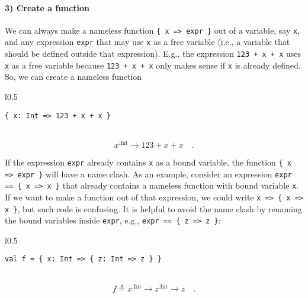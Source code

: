 \paragraph{3) Create a function}

We can always make a nameless function \lstinline!{ x => expr }!
out of a variable, say \lstinline!x!, and any expression \lstinline!expr!
that may use \lstinline!x! as a free variable
(i.e., a variable that should be defined outside that expression).
E.g., the expression \lstinline!123 + x + x! uses \lstinline!x!
as a free variable because \lstinline!123 + x + x! only makes sense
if \lstinline!x! is already defined. So, we can create a nameless
function

\begin{wrapfigure}{l}{0.5\columnwidth}%
\vspace{-0.65\baselineskip}
\begin{lstlisting}
{ x: Int => 123 + x + x }
\end{lstlisting}

\vspace{-0.25\baselineskip}
\end{wrapfigure}%

~\vspace{-0.35\baselineskip}
\[
x^{:\text{Int}}\rightarrow123+x+x\quad.
\]
\vspace{-0.85\baselineskip}

If the expression \lstinline!expr! already contains \lstinline!x!
as a bound variable, the function \lstinline!{ x => expr }! will
have a name clash. As an example, consider an expression \lstinline!expr == { x => x }!
that already contains a nameless function with bound variable \lstinline!x!.
If we want to make a function out of that expression, we could write
\lstinline!x => { x => x }!, but such code is confusing. It is helpful
to avoid the name clash by renaming the bound variables inside \lstinline!expr!,
e.g., \lstinline!expr == { z => z }!:

\begin{wrapfigure}{l}{0.5\columnwidth}%
\vspace{-0.65\baselineskip}
\begin{lstlisting}
val f = { x: Int => { z: Int => z } }
\end{lstlisting}

\vspace{-0.25\baselineskip}
\end{wrapfigure}%

~\vspace{-0.35\baselineskip}
\[
f\triangleq x^{:\text{Int}}\rightarrow z^{:\text{Int}}\rightarrow z\quad.
\]
\vspace{-0.85\baselineskip}



